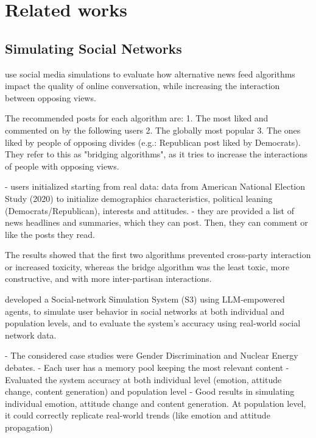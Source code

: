 \section{Related works}
\label{sec:relatedworks}

\subsection{Simulating Social Networks}

\citet{törnberg2023simulatingsocialmediausing} use social media simulations to evaluate how alternative news feed algorithms impact the quality of online conversation, while increasing the interaction between opposing views.

The recommended posts for each algorithm are:
1. The most liked and commented on by the following users
2. The globally most popular
3. The ones liked by people of opposing divides (e.g.: Republican post liked by Democrats). They refer to this as "bridging algorithms", as it tries to increase the interactions of people with opposing views.

- users initialized starting from real data: data from American National Election Study (2020) to initialize demographics characteristics, political leaning (Democrats/Republican), interests and attitudes.
- they are provided a list of news headlines and summaries, which they can post. Then, they can comment or like the posts they read.

The results showed that the first two algorithms prevented cross-party interaction or increased toxicity, whereas the bridge algorithm was the least toxic, more constructive, and with more inter-partisan interactions.

\citet{gao2023s3socialnetworksimulationlarge} developed a Social-network Simulation System (S3) using LLM-empowered agents, to simulate user behavior in social networks at both individual and population levels, and to evaluate the system’s accuracy using real-world social network data.

- The considered case studies were Gender Discrimination and Nuclear Energy debates.
- Each user has a memory pool keeping the most relevant content
- Evaluated the system accuracy at both individual level (emotion, attitude change, content generation) and population level
- Good results in simulating individual emotion, attitude change and content generation. At population level, it could correctly replicate real-world trends (like emotion and attitude propagation)


